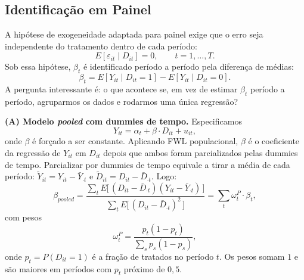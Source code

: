 \subsection{Identificação em Painel}
\label{subsubsec:identificacao-painel}

A hipótese de exogeneidade adaptada para painel exige que o erro seja independente do tratamento dentro de cada período:
\begin{equation}
E[\varepsilon_{it} \mid D_{it}] = 0, \qquad t = 1, \dots, T.
\label{eq:exog-painel}
\end{equation}
Sob essa hipótese, $\beta_t$ é identificado período a período pela diferença de médias:
\begin{equation}
\beta_t = E[Y_{it} \mid D_{it} = 1] - E[Y_{it} \mid D_{it} = 0].
\label{eq:beta-t}
\end{equation}
A pergunta interessante é: o que acontece se, em vez de estimar $\beta_t$ período a período, agruparmos os dados e rodarmos uma única regressão?

\textbf{(A) Modelo \textit{pooled} com dummies de tempo.} Especificamos
\begin{equation}
Y_{it} = \alpha_t + \beta \cdot D_{it} + u_{it},
\label{eq:pooled}
\end{equation}
onde $\beta$ é forçado a ser constante. Aplicando FWL populacional, $\beta$ é o coeficiente da regressão de $Y_{it}$ em $D_{it}$ depois que ambos foram parcializados pelas dummies de tempo. Parcializar por dummies de tempo equivale a tirar a média de cada período: $\tilde{Y}_{it} = Y_{it} - \bar{Y}_{\cdot t}$ e $\tilde{D}_{it} = D_{it} - \bar{D}_{\cdot t}$. Logo:
\begin{equation}
\beta_{pooled} = \frac{\sum_t E\big[\,(D_{it} - \bar{D}_{\cdot t})(Y_{it} - \bar{Y}_{\cdot t})\,\big]}{\sum_t E\big[\,(D_{it} - \bar{D}_{\cdot t})^2\,\big]}
= \sum_t \omega_t^{P} \cdot \beta_t,
\label{eq:pooled-pesos}
\end{equation}
com pesos
\begin{equation}
\omega_t^{P} = \frac{p_t (1 - p_t)}{\sum_s p_s (1 - p_s)},
\label{eq:pesos-pooled}
\end{equation}
onde $p_t = P(D_{it} = 1)$ é a fração de tratados no período $t$. Os pesos somam $1$ e são maiores em períodos com $p_t$ próximo de $0{,}5$.

